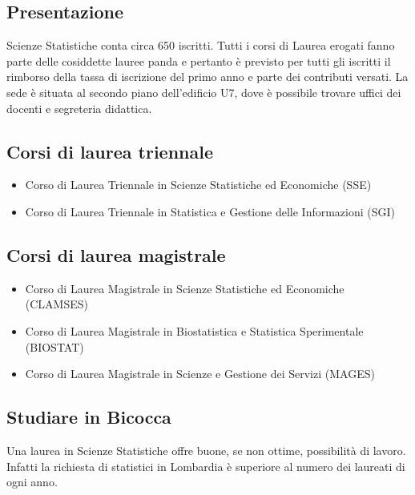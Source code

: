 
\subsection{Presentazione}
Scienze Statistiche conta circa 650 iscritti. Tutti i corsi di Laurea erogati fanno parte delle cosiddette lauree panda e pertanto è previsto per tutti gli iscritti il rimborso della tassa di iscrizione del primo anno e parte dei contributi versati. 
La sede è situata al secondo piano dell'edificio U7, dove è possibile trovare uffici dei docenti e segreteria didattica.
 
\subsection{Corsi di laurea triennale} 

\begin{itemize}
\item Corso di Laurea Triennale in Scienze Statistiche ed Economiche (SSE) 
\item Corso di Laurea Triennale in Statistica e Gestione delle Informazioni (SGI) 
\end{itemize}

\subsection{Corsi di laurea magistrale}
\begin{itemize}
\item Corso di Laurea Magistrale in Scienze Statistiche ed Economiche (CLAMSES) 
\item Corso di Laurea Magistrale in Biostatistica e Statistica Sperimentale (BIOSTAT)
\item Corso di Laurea Magistrale in Scienze e Gestione dei Servizi (MAGES)
\end{itemize}

\subsection{Studiare in Bicocca}
Una laurea in Scienze Statistiche offre buone, se non ottime, possibilità di lavoro. Infatti la richiesta di statistici in Lombardia è superiore al numero dei laureati di ogni anno. 

